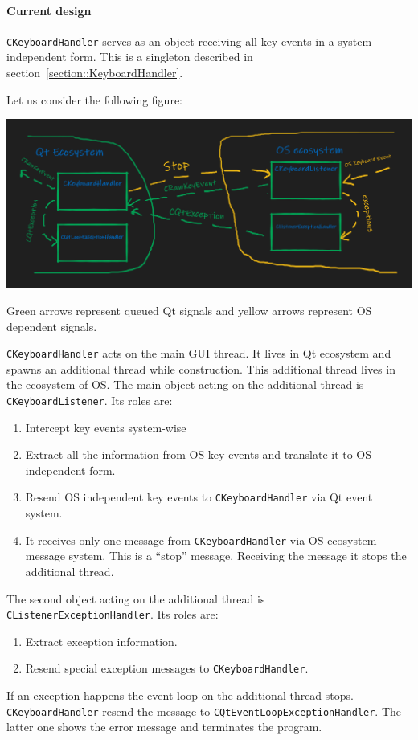 \documentclass{article}
\begin{document}
\paragraph{Current design}

\verb"CKeyboardHandler" serves as an object receiving all key events in a system independent form. This is a singleton described in section~\ref{section::KeyboardHandler}.

Let us consider the following figure:
\begin{center}
\includegraphics[scale = 0.5]{Figures/KeyboardInterception.png}

Green arrows represent queued Qt signals and yellow arrows represent OS dependent signals.
\end{center}

\verb"CKeyboardHandler" acts on the main GUI thread. It lives in Qt ecosystem and spawns an additional thread while construction. This additional thread lives in the ecosystem of OS. The main object acting on the additional thread is \verb"CKeyboardListener". Its roles are:
\begin{enumerate}
\item Intercept key events system-wise
\item Extract all the information from OS key events and translate it to OS independent form.
\item Resend OS independent key events to \verb"CKeyboardHandler" via Qt event system.
\item It receives only one message from \verb"CKeyboardHandler" via OS ecosystem message system. This is a ``stop'' message. Receiving the message it stops the additional thread.
\end{enumerate}

The second object acting on the additional thread is \verb"CListenerExceptionHandler". Its roles are:
\begin{enumerate}
\item Extract exception information.
\item Resend special exception messages to \verb"CKeyboardHandler".
\end{enumerate}
If an exception happens the event loop on the additional thread stops. \verb"CKeyboardHandler" resend the message to \verb"CQtEventLoopExceptionHandler". The latter one shows the error message and terminates the program.
\end{document}
